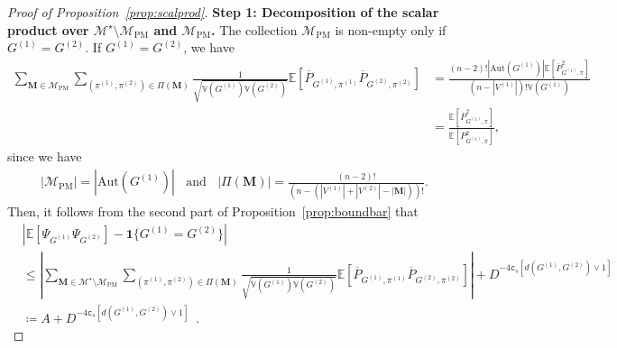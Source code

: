 \documentclass[final]{colt2026}
\newcommand{\1}{\mathbf{1}}
\begin{document}
\begin{proof}[Proof of Proposition~\ref{prop:scalprod}]
\medskip 
\noindent
{\bf Step 1: Decomposition of the scalar product over $\mathcal M^\star \setminus \mathcal M_{\mathrm{PM}}$ and $ \mathcal M_{\mathrm{PM}}$.} The collection $\mathcal{M}_{\mathrm{PM}}$ is non-empty only if $G^{(1)} = G^{(2)}$. If $G^{(1)} = G^{(2)}$, we have
\begin{align*}
\sum_{\mathbf{M}\in\mathcal{M}_{\mathrm{PM}}}\sum_{(\pi^{(1)}, \pi^{(2)})\in \Pi(\mathbf{M})}\frac{1}{\sqrt{\mathbb{V}(G^{(1)})\mathbb{V}(G^{(2)})}}\mathbb{E}\left[\overline{P}_{G^{(1)}, \pi^{(1)}}\overline{P}_{G^{(2)}, \pi^{(2)}}\right] &=  \frac{(n-2)!|\mathrm{Aut}(G^{(1)})|\mathbb{E}\left[\overline{P}_{G^{(1)}, \pi}^2\right]}{\left(n-|V^{(1)}|\right)!\mathbb{V}(G^{(1)})}  \\
&=  \frac{\mathbb E[\overline{P}_{G^{(1)}, \pi}^2]}{\mathbb E[P_{G^{(1)}, \pi}^2]},\end{align*}
since  we have 
\begin{align}\label{eq:boubou}
    |\mathcal{M}_{\mathrm{PM}}| =|\mathrm{Aut}(G^{(1)})|~~~~\mathrm{and}~~~~|\Pi(\mathbf{M})| = \frac{(n-2)!}{\left(n-(|V^{(1)}|+ |V^{(2)}| - |\mathbf M|)\right)!}.
\end{align}
Then, it follows from the second part of  Proposition~\ref{prop:boundbar} that 
\begin{align}\nonumber
     &\left|\mathbb E\left[\Psi_{G^{(1)}}\Psi_{G^{(2)}}\right] - \mathbf 1\{G^{(1)} = G^{(2)}\} \right|\\
     &\leq  \left|\sum_{\mathbf{M}\in\mathcal{M}^{\star}\setminus \mathcal M_{\mathrm{PM}}}\sum_{(\pi^{(1)}, \pi^{(2)})\in \Pi(\mathbf{M})}\frac{1}{\sqrt{\mathbb{V}(G^{(1)})\mathbb{V}(G^{(2)})}}\mathbb{E}\left[\overline{P}_{G^{(1)}, \pi^{(1)}}\overline{P}_{G^{(2)}, \pi^{(2)}}\right]\right|  + D^{-4\texttt{c}_s[d(G^{(1)},G^{(2)})\vee 1]} \nonumber\\ 
   &  \coloneqq A  + D^{-4\texttt{c}_s[d(G^{(1)},G^{(2)})\vee 1]}\enspace . \label{eq:upper_correlation}
    \end{align}


\end{proof}
\end{document}
